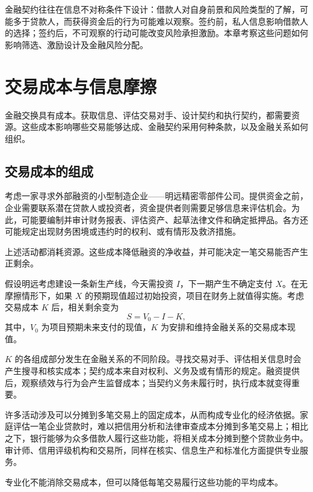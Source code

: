 金融契约往往在信息不对称条件下设计：借款人对自身前景和风险类型的了解，可能多于贷款人，而获得资金后的行为可能难以观察。签约前，私人信息影响借款人的选择；签约后，不可观察的行动可能改变风险承担激励。本章考察这些问题如何影响筛选、激励设计及金融风险分配。

\section{交易成本与信息摩擦}

金融交换具有成本。获取信息、评估交易对手、设计契约和执行契约，都需要资源。这些成本影响哪些交易能够达成、金融契约采用何种条款，以及金融关系如何组织。

\subsection{交易成本的组成}

考虑一家寻求外部融资的小型制造企业——明远精密零部件公司。提供资金之前，企业需要联系潜在贷款人或投资者，资金提供者则需要足够信息来评估机会。为此，可能要编制并审计财务报表、评估资产、起草法律文件和确定抵押品。各方还可能规定出现财务困境或违约时的权利、或有情形及救济措施。

上述活动都消耗资源。这些成本降低融资的净收益，并可能决定一笔交易能否产生正剩余。

假设明远考虑建设一条新生产线，今天需投资 $I$，下一期产生不确定支付 $X$。在无摩擦情形下，如果 $X$ 的预期现值超过初始投资，项目在财务上就值得实施。考虑交易成本 $K$ 后，相关剩余变为
\begin{equation}
S = V_{0}-I-K,
\label{eq:ch3-transaction-surplus}
\end{equation}
其中，$V_{0}$ 为项目预期未来支付的现值，$K$ 为安排和维持金融关系的交易成本现值。

\(K\) 的各组成部分发生在金融关系的不同阶段。寻找交易对手、评估相关信息时会产生搜寻和核实成本；契约成本来自对权利、义务及或有情形的规定。融资提供后，观察绩效与行为会产生监督成本；当契约义务未履行时，执行成本就变得重要。

许多活动涉及可以分摊到多笔交易上的固定成本，从而构成专业化的经济依据。家庭评估一笔企业贷款时，难以把信用分析和法律审查成本分摊到多笔交易上；相比之下，银行能够为众多借款人履行这些功能，将相关成本分摊到整个贷款业务中。审计师、信用评级机构和交易所，同样在核实、信息生产和标准化方面提供专业服务。

专业化不能消除交易成本，但可以降低每笔交易履行这些功能的平均成本。

